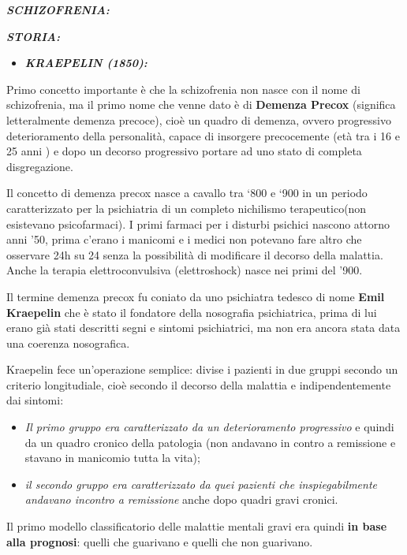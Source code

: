 \documentclass[]{article}
\date{}
\begin{document}
\textbf{\emph{SCHIZOFRENIA:}}

\textbf{\emph{STORIA:}}

\begin{itemize}
\item
  \textbf{\emph{KRAEPELIN (1850):}}
\end{itemize}

Primo concetto importante è che la schizofrenia non nasce con il nome di
schizofrenia, ma il primo nome che venne dato è di \textbf{Demenza
Precox} (significa letteralmente demenza precoce), cioè un quadro di
demenza, ovvero progressivo deterioramento della personalità, capace di
insorgere precocemente (età tra i 16 e 25 anni ) e dopo un decorso
progressivo portare ad uno stato di completa disgregazione.

Il concetto di demenza precox nasce a cavallo tra `800 e `900 in un
periodo caratterizzato per la psichiatria di un completo nichilismo
terapeutico(non esistevano psicofarmaci). I primi farmaci per i disturbi
psichici nascono attorno anni '50, prima c'erano i manicomi e i medici
non potevano fare altro che osservare 24h su 24 senza la possibilità di
modificare il decorso della malattia. Anche la terapia elettroconvulsiva
(elettroshock) nasce nei primi del '900.

Il termine demenza precox fu coniato da uno psichiatra tedesco di nome
\textbf{Emil Kraepelin} che è stato il fondatore della nosografia
psichiatrica, prima di lui erano già stati descritti segni e sintomi
psichiatrici, ma non era ancora stata data una coerenza nosografica.

Kraepelin fece un'operazione semplice: divise i pazienti in due gruppi
secondo un criterio longitudiale, cioè secondo il decorso della malattia
e indipendentemente dai sintomi:

\begin{itemize}
\item
  \emph{Il primo gruppo era caratterizzato da un deterioramento
  progressivo} e quindi da un quadro cronico della patologia (non
  andavano in contro a remissione e stavano in manicomio tutta la vita);
\item
  \emph{il secondo gruppo era caratterizzato da quei pazienti che
  inspiegabilmente andavano incontro a remissione} anche dopo quadri
  gravi cronici.
\end{itemize}

Il primo modello classificatorio delle malattie mentali gravi era quindi
\textbf{in base alla prognosi}: quelli che guarivano e quelli che non
guarivano.
\end{document}
